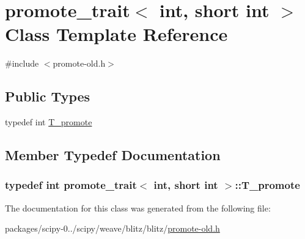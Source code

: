 \hypertarget{classpromote__trait_3_01int_00_01short_01int_01_4}{}\section{promote\+\_\+trait$<$ int, short int $>$ Class Template Reference}
\label{classpromote__trait_3_01int_00_01short_01int_01_4}


{\ttfamily \#include $<$promote-\/old.\+h$>$}

\subsection*{Public Types}
\begin{DoxyCompactItemize}
\item 
typedef int \hyperlink{classpromote__trait_3_01int_00_01short_01int_01_4_a96ab53efa392885266fd37da48ca1f2f}{T\+\_\+promote}
\end{DoxyCompactItemize}


\subsection{Member Typedef Documentation}
\hypertarget{classpromote__trait_3_01int_00_01short_01int_01_4_a96ab53efa392885266fd37da48ca1f2f}{}
\subsubsection[{T\+\_\+promote}]{\setlength{\rightskip}{0pt plus 5cm}typedef int {\bf promote\+\_\+trait}$<$ int, short int $>$\+::{\bf T\+\_\+promote}}\label{classpromote__trait_3_01int_00_01short_01int_01_4_a96ab53efa392885266fd37da48ca1f2f}


The documentation for this class was generated from the following file\+:\begin{DoxyCompactItemize}
\item 
packages/scipy-\/0../scipy/weave/blitz/blitz/\hyperlink{promote-old_8h}{promote-\/old.\+h}\end{DoxyCompactItemize}
